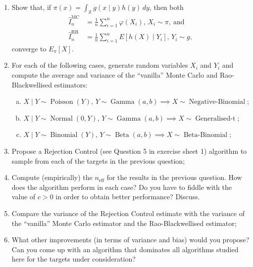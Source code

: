 \documentclass[a4paper,10pt, notitlepage]{report}
\begin{document}
\begin{enumerate}
 \item Show that, if $\pi(x) = \int_{\mathbb{X}} g(x\mid y) h(y)\,dy$, then both
 \begin{align*}
 \hat{I}_n^{\text{MC}} &= \frac{1}{n} \sum_{i=1}^n \varphi(X_i), \, X_i \sim \pi, \: \text{and}\\
 \hat{I}_n^{\text{RB}} &= \frac{1}{n} \sum_{i=1}^n E[h(X) \mid Y_i] , \, Y_i \sim g, 
 \end{align*}
converge to $E_\pi[X]$.
\item For each of the following cases, generate random variables $X_i$ and $Y_i$ and compute the average and variance of the ``vanilla'' Monte Carlo and Rao-Blackwellised estimators:
\begin{enumerate}[(a)]
 \item $X\mid Y \sim \operatorname{Poisson}(Y),\, Y \sim \operatorname{Gamma}(a, b) \implies X \sim \operatorname{Negative-Binomial}$;
  \item $X\mid Y \sim \operatorname{Normal}(0, Y),\, Y \sim \operatorname{Gamma}(a, b) \implies X \sim \operatorname{Generalised-t}$;
   \item $X\mid Y \sim \operatorname{Binomial}(Y),\, Y \sim \operatorname{Beta}(a, b) \implies X \sim \operatorname{Beta-Binomial}$;
 \end{enumerate}
 
 \item Propose a Rejection Control (see Question 5 in exercise sheet 1) algorithm to sample from each of the targets in the previous question;
 \item Compute (empirically) the $n_{\text{eff}}$ for the results in the previous question.
 How does the algorithm perform in each case? 
 Do you have to fiddle with the value of $c >0$ in order to obtain better performance?
 Discuss.
 \item Compare the variance of the Rejection Control estimate with the variance of the ``vanilla'' Monte Carlo estimator and the Rao-Blackwellised  estimator;
 \item What other improvements (in terms of variance and bias) would you propose?
 Can you come up with an algorithm that dominates all algorithms studied here for the targets under consideration?
\end{enumerate}

% 
% 
% 
\end{document}
